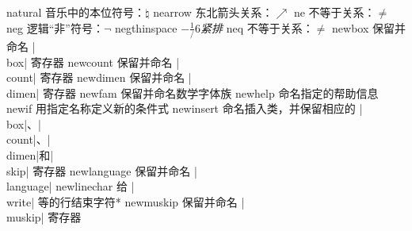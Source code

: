 \capcs natural {音乐中的本位符号：$\natural$}{}{}
\capcs nearrow {东北箭头关系：$\nearrow$}{}{}
\capcs ne {不等于关系：$\ne$}{}{}
\capcs neg {逻辑“非”符号：$\neg$}{}{}
\capcs negthinspace {$-\frac1/6$\em 紧排}{}{}
\capcs neq {不等于关系：$\neq$}{}{}
\capcs newbox {保留并命名 |\\box| 寄存器}{}{\@newbox}
\capcs newcount {保留并命名 |\\count| 寄存器}{}{\@newcount}
\capcs newdimen {保留并命名 |\\dimen| 寄存器}{}{\@newdimen}
\capcs newfam {保留并命名数学字体族}{}{\@newfam}
\capcs newhelp {命名指定的帮助信息}{}{\@newhelp}
\capcs newif {用指定名称定义新的条件式}{}{\@newif}
\capcs newinsert {命名插入类，并保留相应的 |\\box|、|\\count|、|\\dimen|和|\\skip| 寄存器}{}{\@newinsert}
\capcs newlanguage {保留并命名 |\\language|}{}{\@newlanguage}
\capcs newlinechar {给 |\\write| 等的行结束字符}*{}
\capcs newmuskip {保留并命名 |\\muskip| 寄存器}{}{\@newmuskip}
